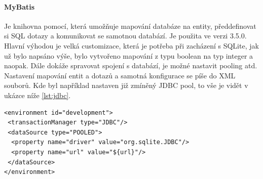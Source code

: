\paragraph{MyBatis} 
Je knihovna pomocí, která umožňuje mapování databáze na entity, předdefinovat si SQL dotazy a komunikovat se samotnou databází. Je použita ve verzi 3.5.0. Hlavní výhodou je velká customizace, která je potřeba při zacházení s SQLite, jak už bylo napsáno výše, bylo vytvořeno mapování z typu boolean na typ integer a naopak. Dále dokáže spravovat spojení s databází, je možné nastavit pooling atd. Nastavení mapování entit a dotazů a samotná konfigurace se píše do XML souborů. Kde byl například nastaven již zmíněný JDBC pool, to vše je vidět v ukázce níže \ref{lst:jdbc}.

\begin{lstlisting}[caption=Konfigurace JDBC poolu, label={lst:jdbc}]
<environment id="development">
 <transactionManager type="JDBC"/>
 <dataSource type="POOLED">
  <property name="driver" value="org.sqlite.JDBC"/>
  <property name="url" value="${url}"/>
 </dataSource>
</environment>
\end{lstlisting}
